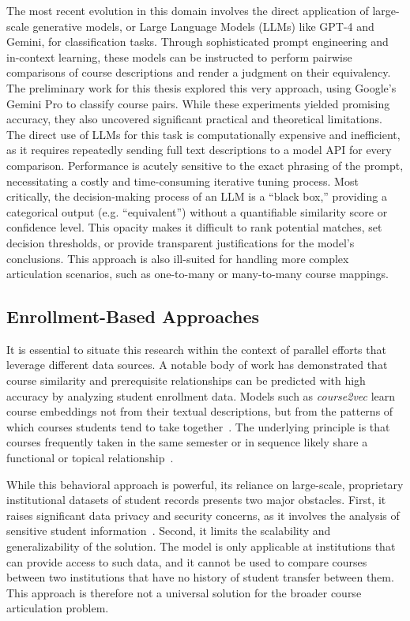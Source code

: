     The most recent evolution in this domain involves the direct application of large-scale generative models, or Large Language Models (LLMs) like GPT-4 and Gemini, for classification tasks. Through sophisticated prompt engineering and in-context learning, these models can be instructed to perform pairwise comparisons of course descriptions and render a judgment on their equivalency. The preliminary work for this thesis explored this very approach, using Google's Gemini Pro to classify course pairs. While these experiments yielded promising accuracy, they also uncovered significant practical and theoretical limitations. The direct use of LLMs for this task is computationally expensive and inefficient, as it requires repeatedly sending full text descriptions to a model API for every comparison. Performance is acutely sensitive to the exact phrasing of the prompt, necessitating a costly and time-consuming iterative tuning process. Most critically, the decision-making process of an LLM is a ``black box,'' providing a categorical output (e.g. ``equivalent'') without a quantifiable similarity score or confidence level. This opacity makes it difficult to rank potential matches, set decision thresholds, or provide transparent justifications for the model's conclusions. This approach is also ill-suited for handling more complex articulation scenarios, such as one-to-many or many-to-many course mappings.

    \subsection{Enrollment-Based Approaches}
    It is essential to situate this research within the context of parallel efforts that leverage different data sources. A notable body of work has demonstrated that course similarity and prerequisite relationships can be predicted with high accuracy by analyzing student enrollment data. Models such as \emph{course2vec} learn course embeddings not from their textual descriptions, but from the patterns of which courses students tend to take together~\cite{pardos2018connectionistrecommendationwildutility}. The underlying principle is that courses frequently taken in the same semester or in sequence likely share a functional or topical relationship~\cite{pardos2018connectionistrecommendationwildutility}.

    While this behavioral approach is powerful, its reliance on large-scale, proprietary institutional datasets of student records presents two major obstacles. First, it raises significant data privacy and security concerns, as it involves the analysis of sensitive student information~\cite{slade10.1177/0002764213479366}. Second, it limits the scalability and generalizability of the solution. The model is only applicable at institutions that can provide access to such data, and it cannot be used to compare courses between two institutions that have no history of student transfer between them. This approach is therefore not a universal solution for the broader course articulation problem.

